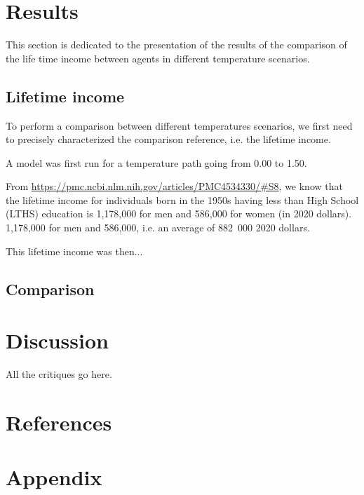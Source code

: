 \documentclass{article}
\begin{document}

\section{Results}

This section is dedicated to the presentation of the results of the comparison 
of the life time income between agents in different temperature scenarios. 

\subsection{Lifetime income}

To perform a comparison between different temperatures scenarios,
we first need to precisely characterized the comparison reference, 
i.e. the lifetime income.

A model was first run for a temperature path going from 0.00 to 1.50. 

From \url{https://pmc.ncbi.nlm.nih.gov/articles/PMC4534330/#S8}, 
we know that the lifetime income for individuals born in the 1950s 
having less than 
High School (LTHS) education is 1,178,000 for men and 586,000 for women (in 2020 dollars).
1,178,000 for men and 586,000, i.e. an average of 882\ 000 2020 dollars. 

This lifetime income was then... 

\subsection{Comparison}

\section{Discussion}

All the critiques go here. 

\section{References}

\printbibliography

\newpage
\section{Appendix}
\end{document}
